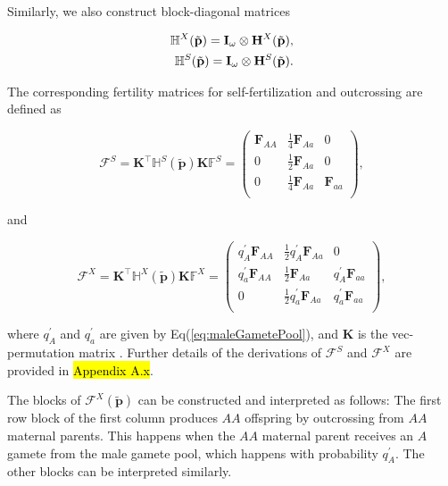 \documentclass[11pt]{article}
\def\mbf#1{\mathbf{#1}}
\def\mbb#1{\mathbb{#1}}
\def\mcal#1{\mathcal{#1}}
\newcommand{\bo}[1]{{\bf #1}}
\newcommand{\om}{\omega}
\newcommand{\kron}{\otimes}
\begin{document}
Similarly, we also construct block-diagonal matrices
\begin{linenomath*}
\begin{eqnarray}
	\mathbb{H}^X(\tilde{\bo p}) = \bo I_\om \kron \bo H^X(\tilde{\bo p}),\\
	\mathbb{H}^S(\tilde{\bo p}) = \bo I_\om \kron \bo H^S(\tilde{\bo p}).
\end{eqnarray}
\end{linenomath*}
The corresponding fertility matrices for self-fertilization and outcrossing are defined as
\begin{linenomath*}
\begin{equation} \label{eq:BlkFS}
	\mcal{F}^S = \mbf{K}^{\intercal} \mbb{H}^S(\tilde{\mbf{p}}) \mbf{K} \mbb{F}^S = 
			\left(
			\begin{array}{ccc}
				\mbf{F}_{AA} & \frac{1}{4} \mbf{F}_{Aa} & 0 \\
				0 & \frac{1}{2} \mbf{F}_{Aa} & 0 \\
				0 & \frac{1}{4} \mbf{F}_{Aa} & \mbf{F}_{aa}\\
			\end{array} \right), 
\end{equation}
\end{linenomath*}
\noindent and 
\begin{linenomath*}
\begin{equation} \label{eq:BlkFX}
	\mcal{F}^X = \mbf{K}^{\intercal} \mbb{H}^X(\tilde{\mbf{p}}) \mbf{K} \mbb{F}^X = 
			\left(
			\begin{array}{ccc}
				q^{\prime}_{A} \mbf{F}_{AA} & \frac{1}{2} q^{\prime}_{A} \mbf{F}_{Aa} & 0 \\ 
				q^{\prime}_{a} \mbf{F}_{AA} & \frac{1}{2} \mbf{F}_{Aa} & q^{\prime}_{A} \mbf{F}_{aa}  \\ 
				0 & \frac{1}{2} q^{\prime}_{a} \mbf{F}_{Aa} & q^{\prime}_{a} \mbf{F}_{aa}  \\
			\end{array} \right),
\end{equation}
\end{linenomath*}

\noindent where $q^{\prime}_A$ and $q^{\prime}_a$ are given by Eq(\ref{eq:maleGametePool}), and $\mbf{K}$ is the vec-permutation matrix \citep{HendersonSearle1981}. Further details of the derivations of $\mcal{F}^S$ and $\mcal{F}^X$ are provided in \hl{Appendix A.x}. 

The blocks of $\mcal{F}^X(\tilde{\mbf{p}})$ can be constructed and interpreted as follows: The first row block of the first column produces $AA$ offspring by outcrossing from $AA$ maternal parents. This happens when the $AA$ maternal parent receives an $A$ gamete from the male gamete pool, which happens with probability $q^{\prime}_{A}$. The other blocks can be interpreted similarly.
\end{document}
